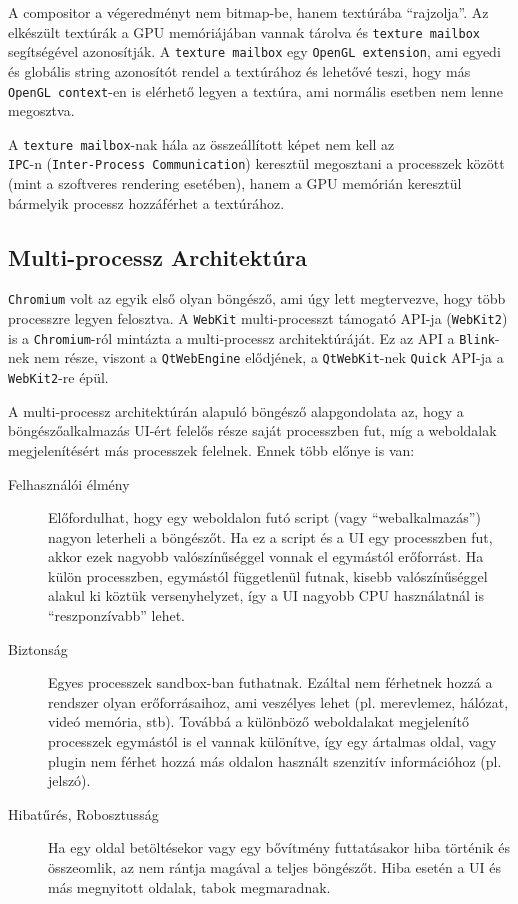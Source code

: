 \documentclass[12pt]{report}
\begin{document}
A compositor a végeredményt nem bitmap-be, hanem textúrába ``rajzolja''. Az elkészült
textúrák a GPU memóriájában vannak tárolva és \texttt{texture mailbox} segítségével
azonosítják. A \texttt{texture mailbox} egy \texttt{OpenGL extension}, ami egyedi és globális
string azonosítót rendel a textúrához és lehetővé teszi, hogy más \texttt{OpenGL context}-en
is elérhető legyen a textúra, ami normális esetben nem lenne megosztva.
\cite{bib-chromium-gpu, bib-chromium-oopifs}

A \texttt{texture mailbox}-nak hála az összeállított képet nem kell az \\
\texttt{IPC}-n (\texttt{Inter-Process Communication}) keresztül megosztani a processzek között
(mint a szoftveres rendering esetében), hanem a GPU memórián keresztül bármelyik
processz hozzáférhet a textúrához.
\cite{bib-chromium-texture-mailbox}

\subsection{Multi-processz Architektúra}
\texttt{Chromium} volt az egyik első olyan böngésző, ami úgy lett megtervezve, hogy több
processzre legyen felosztva. A \texttt{WebKit} multi-processzt támogató
API-ja (\texttt{WebKit2}) is a \texttt{Chromium}-ról mintázta a multi-processz
architektúráját. \cite{bib-webkit-webkit2}
Ez az API a \texttt{Blink}-nek nem része, viszont a \texttt{QtWebEngine} elődjének,
a \texttt{QtWebKit}-nek \texttt{Quick} API-ja a \texttt{WebKit2}-re épül.

A multi-processz architektúrán alapuló böngésző alapgondolata az, hogy a böngészőalkalmazás
UI-ért felelős része saját processzben fut, míg a weboldalak megjelenítésért más
processzek felelnek. Ennek több előnye is van: \cite{bib-chromium-blog-multi-process}
\begin{description}
    \item[Felhasználói élmény]
        Előfordulhat, hogy egy weboldalon futó script (vagy ``webalkalmazás'')
        nagyon leterheli a böngészőt. Ha ez a script és a UI egy processzben fut,
        akkor ezek nagyobb valószínűséggel vonnak el egymástól erőforrást. Ha külön
        processzben, egymástól függetlenül futnak, kisebb valószínűséggel alakul ki
        köztük versenyhelyzet, így a UI nagyobb CPU használatnál is ``reszponzívabb''
        lehet.
    \item[Biztonság]
        Egyes processzek sandbox-ban futhatnak. Ezáltal nem férhetnek hozzá a rendszer
        olyan erőforrásaihoz, ami veszélyes lehet (pl. merevlemez, hálózat,
        videó memória, stb).
        Továbbá a különböző weboldalakat megjelenítő processzek egymástól is el vannak
        különítve, így egy ártalmas oldal, vagy plugin nem férhet hozzá más oldalon használt
        szenzitív információhoz (pl. jelszó).
    \item[Hibatűrés, Robosztusság]
        Ha egy oldal betöltésekor vagy egy bővítmény futtatásakor hiba történik és
        összeomlik, az nem rántja magával a teljes böngészőt. Hiba esetén a UI és más
        megnyitott oldalak, tabok megmaradnak.
    \end{description}
\end{document}
